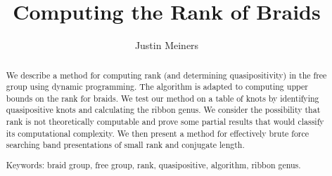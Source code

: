 \documentclass[12pt]{thesis}
\author{Justin Meiners} %
\title{Computing the Rank of Braids}
\begin{document}
\frontmatter
\maketitle  %

\begin{abstract} %


    We describe a method for computing rank (and determining quasipositivity) in the free group
    using dynamic programming.
    The algorithm is adapted to computing upper bounds on the rank for braids.
    We test our method on a table of knots by identifying quasipositive knots and calculating the ribbon
    genus.
    We consider the possibility that rank is not theoretically computable and prove some partial results that
    would classify its computational complexity.
    We then present a method  for effectively brute force searching band presentations of small rank and conjugate length.
    \vspace{\fill}
 
\noindent Keywords: braid group, free group, rank, quasipositive, algorithm, ribbon genus.
    
\end{abstract}



\end{document}
